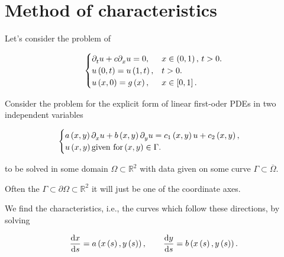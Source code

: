 \appendix




\chapter{Method of characteristics}

\cite{Choksi2022,Arrigo2023}

Let's consider the problem of

\begin{equation*}
	\begin{cases}
		\difcp{u}{t}+
		c\difcp{u}{x}=0,   & x\in\left(0,1\right),\, t>0. \\
		u\left(0,t\right)=
		u\left(1,t\right), & t>0.                         \\
		u\left(x,0\right)=
		g\left(x\right),   & x\in\left[0,1\right].
	\end{cases}
\end{equation*}

Consider the problem for the explicit form of linear first-oder
PDEs in two independent variables

\begin{equation*}
	\begin{cases}
		a
		\left(x,y\right)
		\difcp{u}{x}+
		b
		\left(x,y\right)
		\difcp{u}{y}=
		c_{1}
		\left(x,y\right)
		u+
		c_{2}
		\left(x,y\right), \\
		u\left(x,y\right)
		\text{given for}
		\left(x,y\right)\in
		\Gamma.
	\end{cases}
\end{equation*}

to be solved in some domain
\begin{math}
	\Omega\subset
	\mathbb{R}^{2}
\end{math}
with data given on some curve
\begin{math}
	\Gamma\subset
	\overline\Omega
\end{math}.

Often the
\begin{math}
	\Gamma\subset
	\partial\Omega\subset
	\mathbb{R}^{2}
\end{math}
it will just be one of the coordinate axes.

We find the characteristics, i.e., the curves which follow these
directions, by solving

\begin{equation*}
	\diff{x}{s}=
	a
	\left(
	x\left(s\right),
	y\left(s\right)
	\right),\qquad
	\diff{y}{s}=
	b
	\left(
	x\left(s\right),
	y\left(s\right)
	\right).
\end{equation*}

